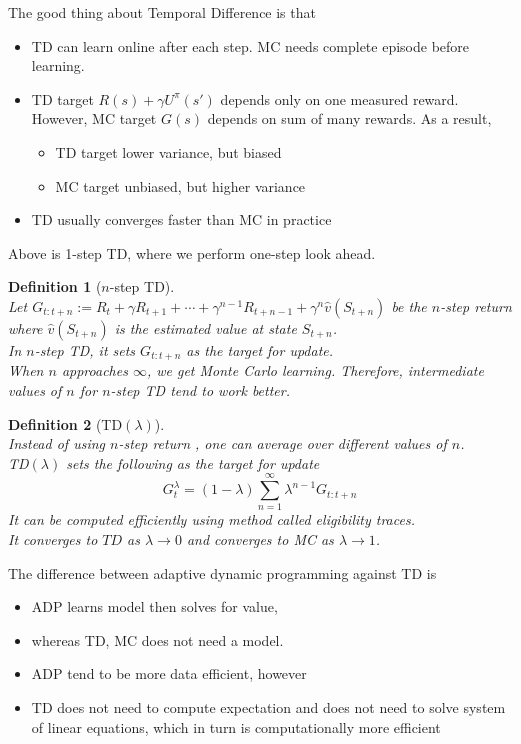 \documentclass[12pt]{article}
\newtheorem{definition}{Definition}[section]
\theoremstyle{definition}
\begin{document}
The good thing about Temporal Difference is that 
\begin{itemize}
	\item TD can learn online after each step. MC needs complete episode before learning.
	\item TD target $R(s)+\gamma U^{\pi}(s')$ depends only on one measured reward. However, MC target $G(s)$ depends on sum of many rewards. As a result,
	\begin{itemize}
		\item TD target lower variance, but biased
		\item MC target unbiased, but higher variance
	\end{itemize}
	\item TD usually converges faster than MC in practice
\end{itemize}
Above is 1-step TD, where we perform one-step look ahead.
\begin{definition}[{$n$}-step TD]
\hfill\\\normalfont Let $G_{t:t+n}:=R_t+\gamma R_{t+1}+\cdots+\gamma^{n-1}R_{t+n-1}+\gamma^n \hat{v}(S_{t+n})$ be the $n$-step return where $\hat{v}(S_{t+n})$ is the estimated value at state $S_{t+n}$.\\
In $n$-step TD, it sets $G_{t:t+n}$ as the target for update. \\
When $n$ approaches $\infty$, we get Monte Carlo learning. Therefore, intermediate values of $n$ for $n$-step TD tend to work better.
\end{definition}
\begin{definition}[TD{$(\lambda)$}]
\hfill\\\normalfont Instead of using $n$-step return , one can average over different values of $n$. \\
TD$(\lambda)$ sets the following as the target for update
\[
G_t^{\lambda}=(1-\lambda)\sum_{n=1}^\infty \lambda^{n-1}G_{t:t+n}
\]
It can be computed efficiently using method called \textit{eligibility traces}.\\
It converges to $TD$ as $\lambda\to 0$ and converges to MC as $\lambda\to 1$.
\end{definition}
The difference between adaptive dynamic programming against TD is
\begin{itemize}
	\item ADP learns model then solves for value,
	\item whereas TD, MC does not need a model.
	\item ADP tend to be more data efficient, however
	\item TD does not need to compute expectation and does not need to solve system of linear equations, which in turn is computationally more efficient
\end{itemize}
\end{document}
